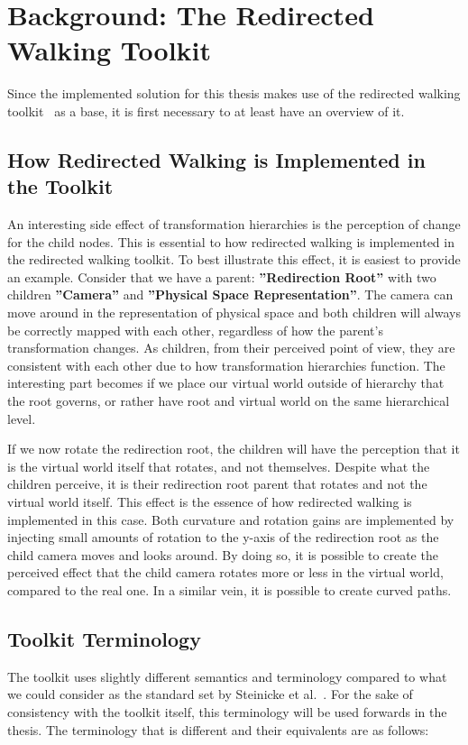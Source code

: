 \section{Background: The Redirected Walking Toolkit}
Since the implemented solution for this thesis makes use of the redirected walking toolkit~\cite{azmandian2016redirected} as a base, it is first necessary to at least have an overview of it. 

\subsection{How Redirected Walking is Implemented in the Toolkit}
An interesting side effect of transformation hierarchies is the perception of change for the child nodes. This is essential to how redirected walking is implemented in the redirected walking toolkit. To best illustrate this effect, it is easiest to provide an example. Consider that we have a parent: \textbf{''Redirection Root''} with two children \textbf{''Camera''} and \textbf{''Physical Space Representation''}. The camera can move around in the representation of physical space and both children will always be correctly mapped with each other, regardless of how the parent's transformation changes. As children, from their perceived point of view, they are consistent with each other due to how transformation hierarchies function. The interesting part becomes if we place our virtual world outside of hierarchy that the root governs, or rather have root and virtual world on the same hierarchical level. 

If we now rotate the redirection root, the children will have the perception that it is the virtual world itself that rotates, and not themselves. Despite what the children perceive, it is their redirection root parent that rotates and not the virtual world itself. This effect is the essence of how redirected walking is implemented in this case. Both curvature and rotation gains are implemented by injecting small amounts of rotation to the y-axis of the redirection root as the child camera moves and looks around. By doing so, it is possible to create the perceived effect that the child camera rotates more or less in the virtual world, compared to the real one. In a similar vein, it is possible to create curved paths. 

\subsection{Toolkit Terminology}
The toolkit uses slightly different semantics and terminology compared to what we could consider as the standard set by Steinicke et al.~\cite{5072212}. For the sake of consistency with the toolkit itself, this terminology will be used forwards in the thesis. The terminology that is different and their equivalents are as follows:

